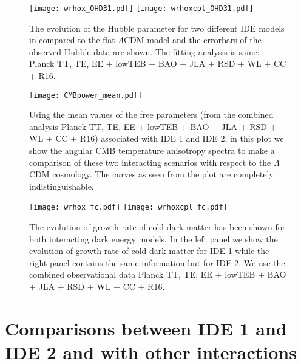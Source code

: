 \documentclass[superscriptaddress,oneolumn,secnumarabic,
amssymb,amsmath,nobibnotes,aps,prd,showpacs,nofootinbib]{revtex4}%
\begin{document}
	\begin{figure}%
		\texttt{[image: wrhox\_OHD31.pdf]}
		\texttt{[image: wrhoxcpl\_OHD31.pdf]}
		\caption{The evolution of the Hubble parameter for two different IDE models in compared to the flat $\Lambda$CDM model and the errorbars of the observed Hubble data are shown. The fitting analysis is same: Planck TT, TE, EE $+$ lowTEB $+$ BAO $+$ JLA $+$ RSD $+$ WL $+$ CC $+$ R16. }

\label{fig:Hubble}
	\end{figure}
	
	\begin{figure}%
		\texttt{[image: CMBpower\_mean.pdf]}
		\caption{Using the mean values of the free parameters (from the combined analysis Planck TT, TE, EE $+$ lowTEB $+$ BAO $+$ JLA $+$ RSD $+$ WL $+$ CC $+$ R16) associated with IDE 1 and IDE 2, in this plot we show the angular CMB temperature anisotropy spectra to make a comparison of these two interacting scenarios with respect to the $\Lambda$CDM cosmology. The curves as seen from the plot are completely indistinguishable. }
		\label{fig:cmbplot-compare}
	\end{figure}

	\begin{figure}%
		\texttt{[image: wrhox\_fc.pdf]}
		\texttt{[image: wrhoxcpl\_fc.pdf]}
		\caption{The evolution of growth rate of cold dark matter has been shown for both interacting dark energy models. In the left panel we show the evolution of growth rate of cold dark matter for IDE 1 while the right panel contains the same information but for IDE 2. We use the combined observational data Planck TT, TE, EE $+$ lowTEB $+$ BAO $+$ JLA $+$ RSD $+$ WL $+$ CC $+$ R16. }
		\label{fig:new-growth}
	\end{figure}


\section{Comparisons between IDE 1 and IDE 2 and with other interactions}
\label{sec-comparison}
\end{document}
